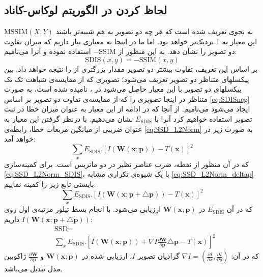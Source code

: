 \documentclass[conference]{IEEEtran-ModifiedForMVIP}
\newcommand{\warp}{\mathbf{W}(\mathbf{x};\mathbf{p})}
\newcommand{\IWarp}{I(\mathbf{W}(\mathbf{x};\mathbf{p}))}
\newcommand{\round}[2]{\frac{\partial{#1}}{\partial{#2}}}
\newcommand{\roundB}[2]{\frac{\partial{\mathbf{#1}}}{\partial{\mathbf{#2}}}}
\begin{document}
\subsection{لحاظ کردن  در الگوریتم لوکاس-کاناد}
$\textrm{MSSIM}(X,Y)$ به نحوی تعریف شده است که هر چه دو تصویر به هم شبیه‌تر باشند این معیار به 1 نزدیک‌تر خواهد بود. اما ما در اینجا به معیاری نیاز داریم که میزان تفاوت دو تصویر را نشان دهد. به این منظور از $-\textrm{SSIM}$ استفاده نموده و آنرا  می‌نامیم:
\begin{equation}\label{eq:SDISneg}
    \textrm{SDIS}(x,y) = -\textrm{SSIM}(x,y)
\end{equation}
بر اساس این تعریف، تفاوت بیشتر دو تصویر مقدار بزرگتری از  را نتیجه خواهد داد.
 بین پیکسلهای متناظر دو تصویر تعریف می‌شود؛ تصویری که از مقایسه‌ی شباهت تک‌ تک پیکسلهای دو تصویر با این معیار حاصل می‌شود در \cite{Wang04image}،  نامیده شده است، به صورت متناظر در اینجا تصویری را که از مقایسه‌ی تفاوت دو تصویر بر اساس \eqref{eq:SDISneg} ایجاد می‌شود  می‌نامیم. از آنجا که در ادامه از این معیار به عنوان میزان خطا در ثبت تصویر استفاده خواهیم کرد آنرا با $E_{\textrm{SDIS}}$ نشان می‌دهیم.  با درنظر گرفتن این معیار به عنوان ضریبی از میانگین مربعات خطا، رابطه‌ی \eqref{eq:SSD_L2Norm} به صورت زیر در خواهد آمد:
\begin{equation}\label{eq:SSD_L2Norm_SDIS}
    \sum_x E_{\textrm{SDIS}}.[\IWarp-T(\mathbf{x})]^2
\end{equation}
که در آن منظور از نقطه، ضرب عناصر نظیر در دو ماتریس است. برای کمینه‌سازی \eqref{eq:SSD_L2Norm_SDIS}، با یک شیوه‌ی تکراری مشابه \eqref{eq:SSD_L2Norm_deltap} بایستی تابع زیر را کمینه نماییم:
\begin{equation}\label{eq:SSD_SDIS_deltap}
    \sum_x E_{\textrm{SDIS}}.[I(\mathbf{W}(\mathbf{x;\mathbf{p+\triangle p}}))-T(\mathbf{x})]^2
\end{equation}
که در آن $E_{\textrm{SDIS}}$ در $\warp$ ارزیابی می‌شود. با انجام بسط تیلور مرتبه‌ی اول روی $I(\mathbf{W}(\mathbf{x;\mathbf{p+\triangle p}}))$ داریم:
\begin{align}
    &\textrm{SSD} =\label{eq:SSD_SDIS_Taylor} \\
	&\sum_x E_{\textrm{SDIS}}.[\IWarp+\nabla I\roundB{W}{p}\triangle \mathbf{p}-T(\mathbf{x})]^2 \nonumber
\end{align}
که در آن:
$\nabla I=(\round{I}{x},\round{I}{y})$ گرادیان تصویر $I$، ارزیابی شده در $\warp$ و $\roundB{W}{p}$ ژاکوبین مدل تبدیل می‌باشد.
\end{document}
